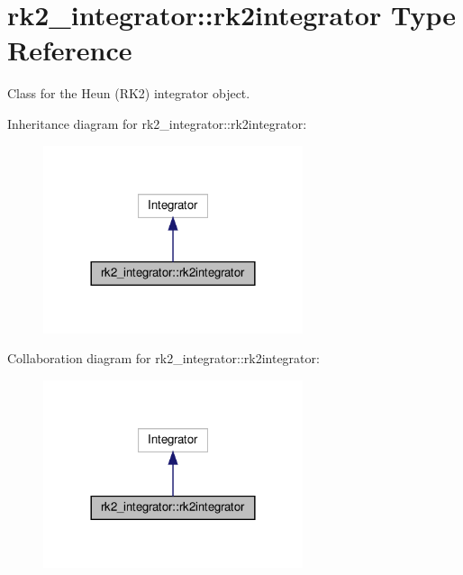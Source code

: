 \hypertarget{structrk2__integrator_1_1rk2integrator}{}\section{rk2\+\_\+integrator\+:\+:rk2integrator Type Reference}
\label{structrk2__integrator_1_1rk2integrator}


Class for the Heun (R\+K2) integrator object.  




Inheritance diagram for rk2\+\_\+integrator\+:\+:rk2integrator\+:\nopagebreak
\begin{figure}[H]
\begin{center}
\leavevmode
\includegraphics[width=216pt]{structrk2__integrator_1_1rk2integrator__inherit__graph}
\end{center}
\end{figure}


Collaboration diagram for rk2\+\_\+integrator\+:\+:rk2integrator\+:\nopagebreak
\begin{figure}[H]
\begin{center}
\leavevmode
\includegraphics[width=216pt]{structrk2__integrator_1_1rk2integrator__coll__graph}
\end{center}
\end{figure}
